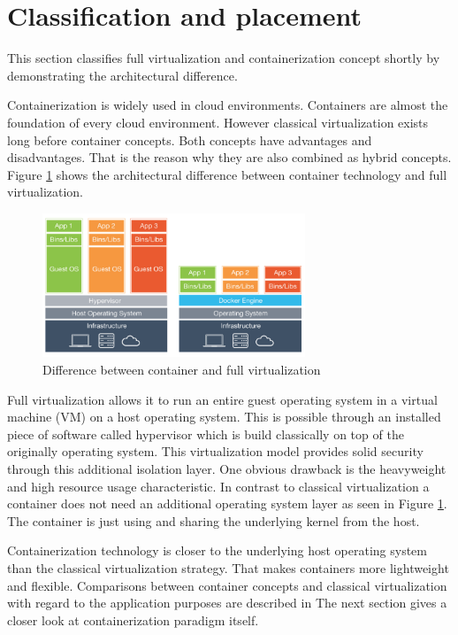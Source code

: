 \section{Classification and placement}
\label{sec:intro:virt_and_cont}
This section classifies full virtualization and containerization concept shortly by demonstrating the architectural difference. 

Containerization is widely used in cloud environments. Containers are almost the foundation of every cloud environment.
However classical virtualization exists long before container concepts. Both concepts have advantages and disadvantages. That is the reason why they are also combined as hybrid concepts.
Figure \ref{fig:intro:diff_container_vm} shows the architectural difference between container technology and full virtualization. 
\begin{figure}[htbp]
 \centering
 \includegraphics[width=0.7\textwidth]{gfx/examples/os_virt_diff}
 \caption{Difference between container and full virtualization}
 \label{fig:intro:diff_container_vm}
\end{figure}
Full virtualization allows it to run an entire guest operating system in a virtual machine (VM) on a host operating system. This is possible through an installed piece of software called hypervisor which is build classically on top of the originally operating system. This virtualization model provides solid security through this additional isolation layer. One obvious drawback is the heavyweight and high resource usage characteristic.
In contrast to classical virtualization a container does not need an additional operating system layer as seen in Figure \ref{fig:intro:diff_container_vm}. The container is just using and sharing the underlying kernel from the host. 

Containerization technology is closer to the underlying host operating system than the classical virtualization strategy. That makes containers more lightweight and flexible. Comparisons between container concepts and classical virtualization with regard to the application purposes are described in \cite{}
The next section gives a closer look at containerization paradigm itself.

